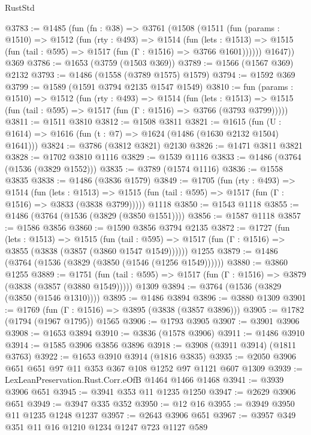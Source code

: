 \begin{lexlean}{RustStd}
\begin{coremodule}
@3783 := @1485
    (fun (fn : @38) =>
    @3761
      (@1508
        (@1511
          (fun (params : @1510) =>
          @1512
            (fun (rty : @493) =>
            @1514
              (fun (lets : @1513) =>
              @1515 (fun (tail : @595) => @1517 (fun (Γ : @1516) => @3766 @1601))))))
        @1647))
    @369
@3786 := @1653 (@3759 (@1503 @369))
@3789 := @1566 (@1567 @369) @2132
@3793 := @1486 (@1558 (@3789 @1575) @1579)
@3794 := @1592 @369
@3799 := @1589 (@1591 @3794 @2135 @1547 @1549)
@3810 := fun (params : @1510) =>
  @1512
    (fun (rty : @493) =>
    @1514
      (fun (lets : @1513) =>
      @1515 (fun (tail : @595) => @1517 (fun (Γ : @1516) => @3766 (@3793 @3799)))))
@3811 := @1511 @3810
@3812 := @1508 @3811
@3821 := @1615 (fun (U : @1614) => @1616 (fun (t : @7) => @1624 (@1486 (@1630 @2132 @1504) @1641)))
@3824 := @3786 (@3812 @3821) @2130
@3826 := @1471 @3811 @3821
@3828 := @1702 @3810 @1116
@3829 := @1539 @1116
@3833 := @1486 (@3764 (@1536 (@3829 @1552)))
@3835 := @3789 (@1574 @1116)
@3836 := @1558 @3835
@3838 := @1486 (@3836 @1579)
@3849 := @1705
    (fun (rty : @493) =>
    @1514
      (fun (lets : @1513) =>
      @1515 (fun (tail : @595) => @1517 (fun (Γ : @1516) => @3833 (@3838 @3799)))))
    @1118
@3850 := @1543 @1118
@3855 := @1486 (@3764 (@1536 (@3829 (@3850 @1551))))
@3856 := @1587 @1118
@3857 := @1586 @3856
@3860 := @1590 @3856 @3794 @2135
@3872 := @1727
    (fun (lets : @1513) =>
    @1515
      (fun (tail : @595) => @1517 (fun (Γ : @1516) => @3855 (@3838 (@3857 (@3860 @1547 @1549))))))
    @1255
@3879 := @1486 (@3764 (@1536 (@3829 (@3850 (@1546 (@1256 @1549))))))
@3880 := @3860 @1255
@3889 := @1751
    (fun (tail : @595) => @1517 (fun (Γ : @1516) => @3879 (@3838 (@3857 (@3880 @1549)))))
    @1309
@3894 := @3764 (@1536 (@3829 (@3850 (@1546 @1310))))
@3895 := @1486 @3894
@3896 := @3880 @1309
@3901 := @1769 (fun (Γ : @1516) => @3895 (@3838 (@3857 @3896)))
@3905 := @1782 (@1794 (@1967 @1795)) @1565
@3906 := @1793 @3905
@3907 := @3901 @3906
@3908 := @1653 @3894
@3910 := @3836 (@1578 @3906)
@3911 := @1486 @3910
@3914 := @1585 @3906 @3856 @3896
@3918 := @3908 (@3911 @3914) (@1811 @3763)
@3922 := @1653 @3910 @3914 (@1816 @3835)
@3935 := @2050 @3906 @651 @651 @97 @11 @353 @367 @108 @1252 @97 @1121 @607 @1309
@3939 := LexLeanPreservation.Rust.Corr.eOfB @1464 @1466 @1468
@3941 := @3939 @3906 @651
@3945 := @3941 @353 @11 @1235 @1250
@3947 := @2629 @3906 @651
@3949 := @3947 @335 @352
@3950 := @12 @16
@3955 := @3949 @3950 @11 @1235 @1248 @1237
@3957 := @2643 @3906 @651
@3967 := @3957 @349 @351 @11 @16 @1210 @1234 @1247 @723 @1127 @589

\end{coremodule}
\end{lexlean}
